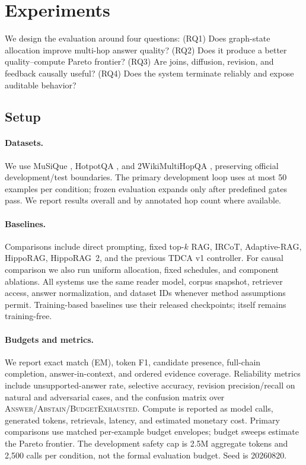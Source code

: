 \section{Experiments}
\label{sec:experiments}

We design the evaluation around four questions: (RQ1) Does graph-state allocation improve multi-hop answer quality? (RQ2) Does it produce a better quality--compute Pareto frontier? (RQ3) Are joins, diffusion, revision, and feedback causally useful? (RQ4) Does the system terminate reliably and expose auditable behavior?

\subsection{Setup}

\paragraph{Datasets.}
We use MuSiQue \citep{trivedi2022musique}, HotpotQA \citep{yang2018hotpotqa}, and 2WikiMultiHopQA \citep{ho2020twowiki}, preserving official development/test boundaries. The primary development loop uses at most 50 examples per condition; frozen evaluation expands only after predefined gates pass. We report results overall and by annotated hop count where available.

\paragraph{Baselines.}
Comparisons include direct prompting, fixed top-$k$ RAG, IRCoT, Adaptive-RAG, HippoRAG, HippoRAG~2, and the previous TDCA v1 controller. For causal comparison we also run uniform allocation, fixed schedules, and component ablations. All systems use the same reader model, corpus snapshot, retriever access, answer normalization, and dataset IDs whenever method assumptions permit. Training-based baselines use their released checkpoints; \method{} itself remains training-free.

\paragraph{Budgets and metrics.}
We report exact match (EM), token F1, candidate presence, full-chain completion, answer-in-context, and ordered evidence coverage. Reliability metrics include unsupported-answer rate, selective accuracy, revision precision/recall on natural and adversarial cases, and the confusion matrix over \textsc{Answer}/\textsc{Abstain}/\textsc{BudgetExhausted}. Compute is reported as model calls, generated tokens, retrievals, latency, and estimated monetary cost. Primary comparisons use matched per-example budget envelopes; budget sweeps estimate the Pareto frontier. The development safety cap is 2.5M aggregate tokens and 2,500 calls per condition, not the formal evaluation budget. Seed is 20260820.

